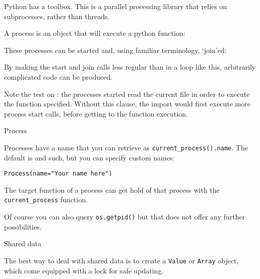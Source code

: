 
\lstset{language=Python}

Python has a  toolbox.
This is a parallel processing library that relies on subprocesses,
rather than threads.

A process is an object that will execute a python function:

These processes can be started and,
using familiar terminology,
`join'ed:

By making the start and join calls less regular than
in a loop like this,
arbitrarily complicated code can be produced.

Note the test on :
the processes started read the current file in order to execute
the function specified.
Without this clause, the import would first execute more process start calls,
before getting to the function execution.

 {Process}

Processes have a name that you can retrieve as
\lstinline+current_process().name+.
The default is  and such,
but you can specify custom names:
\begin{lstlisting}
Process(name="Your name here")
\end{lstlisting}
The target function of a process can get hold of that process
with the  \lstinline+current_process+ function.

Of course you can also query \lstinline+os.getpid()+
but that does not offer any further possibilities.


 {Shared data}

The best way to deal with shared data is to create
a \lstinline{Value} or \lstinline{Array} object,
which come equipped with a lock for safe updating.



